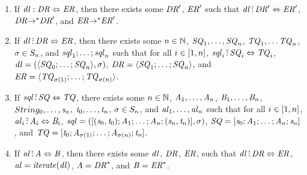 \documentclass[numbers,10pt,preprint\ifanon ,nocopyrightspace\fi]{sigplanconf}
\begin{document}
\begin{lemma}
  \label{lem:dnf-lens-inversion}
  \leavevmode
  \begin{enumerate}
  \item If $\mathit{dl} : \mathit{DR} \Leftrightarrow \mathit{ER}$, then there
    exists some $\mathit{DR}'$, $\mathit{ER}'$ such that
    $\mathit{dl} \,\tilde{:}\, \mathit{DR}' \Leftrightarrow \mathit{ER}'$,
    $\mathit{DR} {\rightarrow}^* \mathit{DR}'$, and $\mathit{ER}
    {\rightarrow}^* \mathit{ER}'$.
  \item If $\mathit{dl} \,\tilde{:}\, \mathit{DR} \Leftrightarrow \mathit{ER}$,
    then there exists some $n\in\mathbb{N}$, $\mathit{SQ}_1,\ldots,\mathit{SQ}_n$,
    $\mathit{TQ}_1,\ldots\mathit{TQ}_n$, $\sigma\in S_{n}$, and
    $\mathit{sql}_1;\ldots;\mathit{sql}_n$ such that
    for all $i\in[1,n]$, $\mathit{sql}_i \,\tilde{:}\,
    \mathit{SQ}_i \Leftrightarrow \mathit{TQ}_i$, $\mathit{dl} =
    (\langle\mathit{SQ}_0;\ldots;\mathit{SQ}_n\rangle,\sigma)$, $\mathit{DR} =
    \langle\mathit{SQ}_1;\ldots;\mathit{SQ}_n\rangle$, and $\mathit{ER} =
    \langle\mathit{TQ}_{\sigma(1)};\ldots;\mathit{TQ}_{\sigma(n)}\rangle$.
  \item If $\mathit{sql} \,\tilde{:}\, \mathit{SQ} \Leftrightarrow
    \mathit{TQ}$, there exists some $n \in \mathbb{N}$,
    $\mathit{A}_1,\ldots,\mathit{A}_n$, $\mathit{B}_1,\ldots,\mathit{B}_n$,
    $String_0,\ldots,\mathit{s}_n$, $\mathit{t}_0,\ldots,\mathit{t}_n$,
    $\sigma\in S_{n}$, and $\mathit{al}_1,\ldots,\mathit{al}_n$ such that
    for all $i\in[1,n]$, $\mathit{al}_i \,\tilde{:}\, \mathit{A}_i
    \Leftrightarrow \mathit{B}_i$, $\mathit{sql} =
    ([(\mathit{s}_0,\mathit{t}_0);\mathit{A}_1;\ldots;
      \mathit{A}_n;(\mathit{s}_n,\mathit{t}_n)],\sigma)$, $\mathit{SQ} =
    [\mathit{s}_0;\mathit{A}_1;\ldots;\mathit{A}_n;\mathit{s}_n]$, and $\mathit{TQ} =
    [\mathit{t}_0;\mathit{A}_{\sigma(1)};\ldots;\mathit{A}_{\sigma(n)};\mathit{t}_n]$.
  \item If $\mathit{al} \,\tilde{:}\, \mathit{A} \Leftrightarrow \mathit{B}$, then
    there exists some $\mathit{dl}$, $\mathit{DR}$, $\mathit{ER}$, such that
    $\mathit{dl} \,\tilde{:}\, \mathit{DR} \Leftrightarrow \mathit{ER}$,
    $\mathit{al} = \mathit{\mathit{iterate}(\mathit{dl})}$, $\mathit{A} = {\mathit{DR}}^*$, and
    $\mathit{B} = {\mathit{ER}}^*$.
  \end{enumerate}
\end{lemma}
\end{document}
